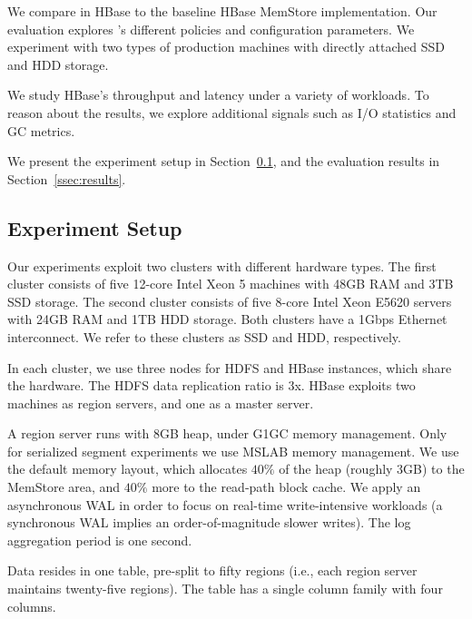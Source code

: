 We compare \sys\/ in HBase to the baseline HBase MemStore implementation.  
Our evaluation explores \sys's different policies and configuration parameters.  
We experiment with two types of production machines with directly attached SSD 
and HDD storage. 

We study HBase's throughput and latency under a variety of workloads. 
To reason about the results, we explore additional signals such as I/O statistics and 
GC metrics.  

We present the experiment setup in Section~\ref{ssec:setup}, and the evaluation 
results in Section~\ref{ssec:results}. 

\subsection{Experiment Setup}
\label{ssec:setup}

Our experiments exploit two clusters with different hardware types. The first cluster consists of five 12-core Intel Xeon 5 
machines with 48GB RAM and 3TB SSD storage. The second cluster consists of five 8-core Intel Xeon E5620 servers 
with 24GB RAM and 1TB HDD storage. Both clusters have a 1Gbps Ethernet interconnect. We refer to these clusters as
SSD and HDD, respectively.

In each cluster, we use three nodes for HDFS and HBase instances, which share the hardware. The HDFS data 
replication ratio is 3x. HBase exploits two machines as region servers, and one as a master server. 

A region server runs  with 8GB heap, under G1GC memory management. Only for serialized segment experiments we use MSLAB memory management.
We use the default memory layout,  which allocates $40\%$ of the heap (roughly 3GB) to the MemStore 
area, and $40\%$ more to the read-path block cache. We apply an asynchronous WAL in order to focus on real-time 
write-intensive workloads (a synchronous WAL implies an order-of-magnitude slower writes). The log aggregation
period is one second. 

Data resides in one table, pre-split to fifty regions (i.e., each region server maintains twenty-five regions). 
The table has a single column family with four columns. 

